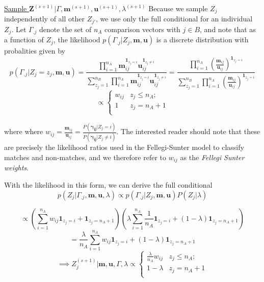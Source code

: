 \documentclass[
  12pt,
]{article}
\begin{document}
\underline{Sample $\mathbf{Z}^{(s+1)}|\Gamma, \mathbf{m}^{(s+1)}, \mathbf{u}^{(s+1)}, \lambda^{(s+1)}$}
Because we sample \(Z_j\) independently of all other \(Z_{j'}\), we use
only the full conditional for an individual \(Z_j\). Let \(\Gamma_{.j}\)
denote the set of \(n_A\) comparison vectors with \(j \in B\), and note
that as a function of \(Z_j\), the likelihood
\(p(\Gamma_{.j}|Z_j, \mathbf{m}, \mathbf{u})\) is a discrete
distribution with probalities given by
\[p(\Gamma_{.j}|Z_j = z_j, \mathbf{m}, \mathbf{u}) = \frac{\prod_{i=1}^{n_A}\mathbf{m}_{ij}^{\mathbf{1}_{z_j = i}}\mathbf{u}_{ij}^{\mathbf{1}_{z_j \neq i}}}{\sum_{z_j = 1}^{n_B} \prod_{i=1}^{n_A}\mathbf{m}_{ij}^{\mathbf{1}_{z_j = i}}\mathbf{u}_{ij}^{\mathbf{1}_{z_j \neq i}}} = \frac{\prod_{i=1}^{n_A}\left(\frac{\mathbf{m}_{ij}}{\mathbf{u}_{ij}}\right)^{\mathbf{1}_{z_j = i}}}{\sum_{z_j = 1}^{n_B}\prod_{i=1}^{n_A}\left(\frac{\mathbf{m}_{ij}}{\mathbf{u}_{ij}}\right)^{\mathbf{1}_{z_j = i}}} \]
\[\propto 
\begin{cases} 
    w_{ij}  & z_j \leq n_A; \\
    1 &  z_j  = n_A + 1 \\
\end{cases}\]

where where
\(w_{ij} = \frac{\mathbf{m}_{ij}}{\mathbf{u}_{ij}} = \frac{P(\boldsymbol{\gamma_{ij}}|Z_j = i)}{P(\boldsymbol{\gamma_{ij}} |Z_j \neq i)}\).
The interested reader should note that these are precisely the
likelihood ratios used in the Fellegi-Sunter model to classify matches
and non-matches, and we therefore refer to \(w_{ij}\) as the
\emph{Fellegi Sunter weights}.

With the likelihood in this form, we can derive the full conditional
\[p(Z_j|\Gamma_{.j}, \mathbf{m} ,\mathbf{u}, \lambda) \propto p(\Gamma_{.j}| Z_j, \mathbf{m} ,\mathbf{u}) P(Z_j|\lambda)\]

\[\propto \left(\sum_{i=1}^{n_A}w_{ij}\mathbf{1}_{z_j = i} + \mathbf{1}_{z_j = n_A + 1}\right)\left(\lambda\sum_{i=1}^{n_A}\frac{1}{n_A}\mathbf{1}_{z_j = i} + (1-\lambda)\mathbf{1}_{z_j = n_A + 1}\right)\]
\[= \frac{\lambda}{n_A}\sum_{i=1}^{n_A}w_{ij}\mathbf{1}_{z_j = i} + (1-\lambda)\mathbf{1}_{z_j = n_A + 1} \]
\[ \implies Z_j^{(s+1)} | \mathbf{m}, \mathbf{u}, \Gamma, \lambda \propto
\begin{cases} 
    \frac{\lambda}{n_A}w_{ij}   & z_j \leq n_A; \\
     1-\lambda &  z_j  = n_A + 1 \\
\end{cases}\]
\end{document}
